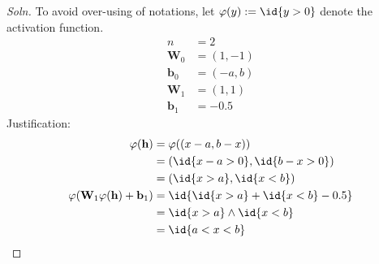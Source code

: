 \documentclass{article}
\begin{document}
	\subsubsection{}
	\begin{proof}[Soln]
		To avoid over-using of notations, let $\varphi(y) := \id{y > 0}$ denote the activation function.
		\begin{align}
			n &= 2 \\
			\textbf{W}_0 &= (1, -1) \\
			\textbf{b}_0 &= (-a, b) \\
			\textbf{W}_1 &= (1, 1) \\
			\textbf{b}_1 &= - 0.5
		\end{align}
		Justification:
		\begin{align}
			\varphi(\textbf{h}) &= \varphi((x - a, b - x)) \\
			&= (\id{x-a>0}, \id{b-x>0}) \\
			&= (\id{x>a}, \id{x<b}) \\
			\varphi(\textbf{W}_1 \varphi(\textbf{h}) + \textbf{b}_1) &= \id{\id{x>a} + \id{x<b} - 0.5} \\
			&=\id{x>a} \land \id{x<b} \\
			&=\id{a < x < b}
		\end{align}
	\end{proof}
\end{document}
